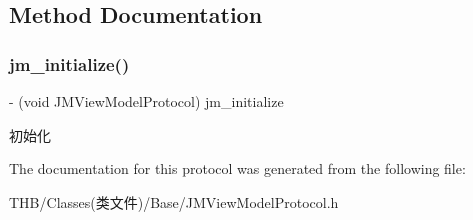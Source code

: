 \subsection{Method Documentation}
\mbox{\label{protocol_j_m_view_model_protocol_01-p_aa6bc1ad6e63bfd1d8d84526804a62b20}} 
\subsubsection{\texorpdfstring{jm\+\_\+initialize()}{jm\_initialize()}}
{\footnotesize\ttfamily -\/ (void J\+M\+View\+Model\+Protocol) jm\+\_\+initialize \begin{DoxyParamCaption}{ }\end{DoxyParamCaption}\hspace{0.3cm}{\ttfamily [optional]}}

初始化 

The documentation for this protocol was generated from the following file\+:\begin{DoxyCompactItemize}
\item 
T\+H\+B/\+Classes(类文件)/\+Base/J\+M\+View\+Model\+Protocol.\+h\end{DoxyCompactItemize}
